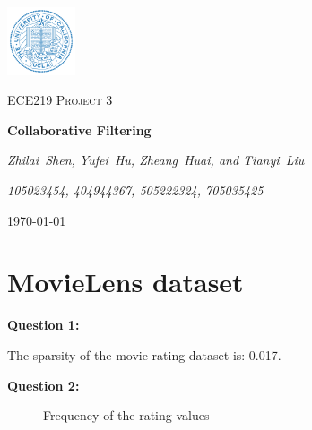 \documentclass{article}
\begin{document}
\begin{titlepage}
	\centering
	\includegraphics[width=0.15\textwidth]{UCLA.png}\par\vspace{1cm}
	\vspace{1cm}
	{\scshape\Large ECE219 Project 3 \par}
	\vspace{1.5cm}
	{\huge\bfseries Collaborative Filtering\par}
	\vspace{2cm}
	{\Large\itshape Zhilai~Shen, Yufei~Hu, Zheang~Huai, and Tianyi~Liu\par}
	{\Large\itshape 105023454, 404944367, 505222324, 705035425\par}
	\vfill

	\vfill

	{\large \today\par}
\end{titlepage}

\tableofcontents

\newpage

\section{MovieLens dataset}

\bigbreak \textbf{Question 1:}

The sparsity of the movie rating dataset is: 0.017.
\newline

\bigbreak \textbf{Question 2:}

\begin{figure}
\centering
{}
\caption{Frequency of the rating values} \label{Q2}
\end{figure}
\end{document}
